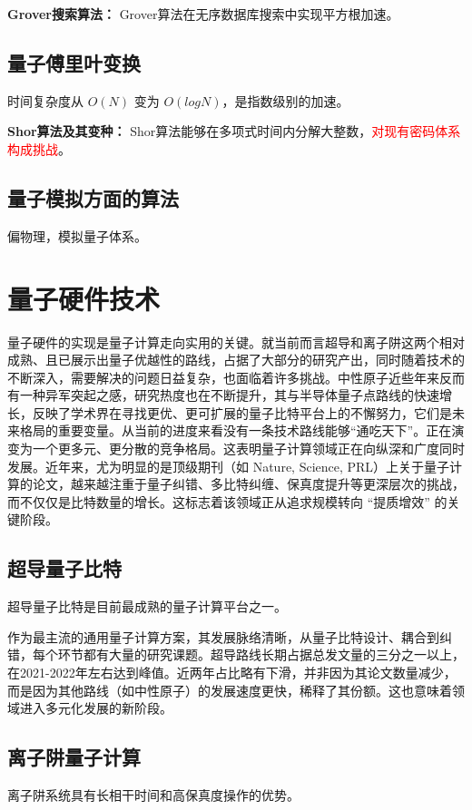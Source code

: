 \documentclass[12pt,a4paper]{article}
\begin{document}
    \textbf{Grover搜索算法：}
    Grover算法在无序数据库搜索中实现平方根加速。

    \subsection{量子傅里叶变换}
    时间复杂度从 $O(N)$ 变为 $O(log N)$，是指数级别的加速。

    \textbf{Shor算法及其变种：}
    Shor算法能够在多项式时间内分解大整数，\textcolor{red}{对现有密码体系构成挑战}。

    \subsection{量子模拟方面的算法}
    偏物理，模拟量子体系。

\section{量子硬件技术}
量子硬件的实现是量子计算走向实用的关键。就当前而言超导和离子阱这两个相对成熟、且已展示出量子优越性的路线，占据了大部分的研究产出，同时随着技术的不断深入，需要解决的问题日益复杂，也面临着许多挑战。中性原子近些年来反而有一种异军突起之感，研究热度也在不断提升，其与半导体量子点路线的快速增长，反映了学术界在寻找更优、更可扩展的量子比特平台上的不懈努力，它们是未来格局的重要变量。从当前的进度来看没有一条技术路线能够“通吃天下”。正在演变为一个更多元、更分散的竞争格局。这表明量子计算领域正在向纵深和广度同时发展。近年来，尤为明显的是顶级期刊（如 Nature, Science, PRL）上关于量子计算的论文，越来越注重于量子纠错、多比特纠缠、保真度提升等更深层次的挑战，而不仅仅是比特数量的增长。这标志着该领域正从追求规模转向 “提质增效” 的关键阶段。


    \subsection{超导量子比特}
    超导量子比特是目前最成熟的量子计算平台之一。

    作为最主流的通用量子计算方案，其发展脉络清晰，从量子比特设计、耦合到纠错，每个环节都有大量的研究课题。超导路线长期占据总发文量的三分之一以上，在2021-2022年左右达到峰值。近两年占比略有下滑，并非因为其论文数量减少，而是因为其他路线（如中性原子）的发展速度更快，稀释了其份额。这也意味着领域进入多元化发展的新阶段。


    \subsection{离子阱量子计算}
    离子阱系统具有长相干时间和高保真度操作的优势。
\end{document}
